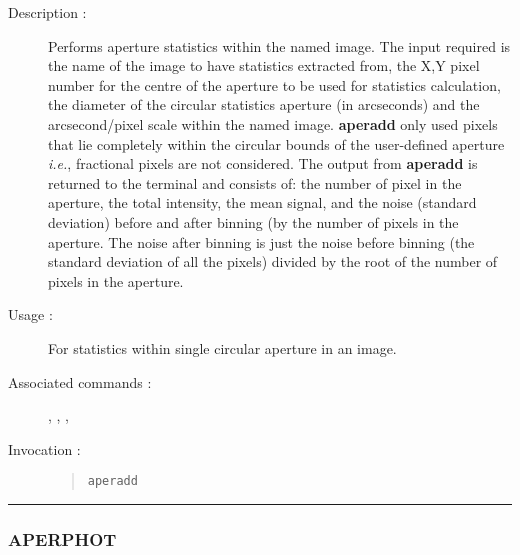 \begin{description}

\item[Description :] Performs aperture statistics within the named
image. The input required is the name of the image to have statistics
extracted from, the X,Y pixel number for the centre of the aperture to
be used for statistics calculation, the diameter of the circular
statistics aperture (in arcseconds) and the arcsecond/pixel scale
within the named image. {\bf aperadd} only used pixels that lie completely
within the circular bounds of the user-defined aperture \emph{i.e.},
fractional pixels are not considered. The output from {\bf aperadd} is
returned to the terminal and consists of: the number of pixel in the
aperture, the total intensity, the mean signal, and the noise (standard
deviation) before and after binning (by the number of pixels in the
aperture.  The noise after binning is just the noise before binning
(the standard deviation of all the pixels) divided by the root of the
number of pixels in the aperture.

\item[Usage :] For statistics within single circular aperture in 
an image.

\item[Associated commands :] {\tt {}}, 
{\tt {}}, {\tt {}}, 
{\tt {}}

\item[Invocation :]

\begin{quote}{\tt  aperadd }\end{quote}

\end{description}

\hrule 
\subsubsection*{\label{APERPHOT}APERPHOT}

